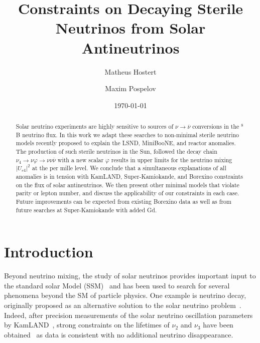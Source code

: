 \documentclass[
reprint,
superscriptaddress,
showpacs,
preprintnumbers,
nofootinbib,
nobibnotes,
amsmath,
amssymb, 
aps,
prd,
floatfix
]{revtex4-1}
\renewcommand{\phi}{\varphi}
\begin{document}

\title{Constraints on Decaying Sterile Neutrinos from Solar Antineutrinos}%


\author{Matheus Hostert}

\author{Maxim Pospelov}

\date{\today}


\begin{abstract}
  Solar neutrino experiments are highly sensitive to sources of $\nu\to\overline{\nu}$ conversions in the $^8$B neutrino flux. In this work we adapt these searches to non-minimal sterile neutrino models recently proposed to explain the LSND, MiniBooNE, and reactor anomalies. The production of such sterile neutrinos in the Sun, followed the decay chain $\nu_4 \to \nu \phi \to \nu \nu \overline{\nu}$ with a new scalar $\phi$ results in upper limits for the neutrino mixing $|U_{e4}|^2$ at the per mille level. We conclude that a simultaneous explanations of all anomalies is in tension with KamLAND, Super-Kamiokande, and Borexino constraints on the flux of solar antineutrinos. We then present other minimal models that violate parity or lepton number, and discuss the applicability of our constraints in each case. Future improvements can be expected from existing Borexino data as well as from future searches at Super-Kamiokande with added Gd.
\end{abstract}

\maketitle


\section{Introduction} 
Beyond neutrino mixing, the study of solar neutrinos provides important input to the standard solar Model (SSM)~\cite{Bahcall:2005va,Agostini:2020mfq} and has been used to search for several phenomena beyond the SM of particle physics. One example is neutrino decay, originally proposed as an alternative solution to the solar neutrino problem~\cite{Bahcall:1972my,Pakvasa:1972gz}. Indeed, after precision measurements of the solar neutrino oscillation parameters by KamLAND~\cite{Abe:2008aa}, strong constraints on the lifetimes of $\nu_2$ and $\nu_3$ have been obtained~\cite{Joshipura:2002fb,Beacom:2002cb} as data is consistent with no additional neutrino disappearance. 
\end{document}
